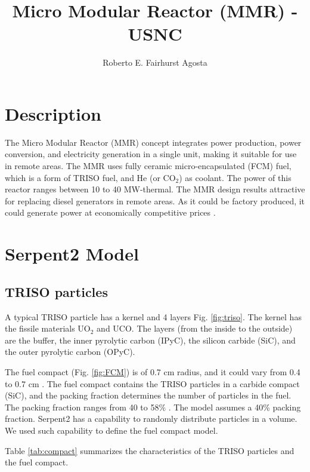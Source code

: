 \documentclass[11pt,letterpaper]{article}
\title{Micro Modular Reactor (MMR) - USNC}
\author{Roberto E. Fairhurst Agosta}
\begin{document}

\section{Description}

The Micro Modular Reactor (MMR) concept integrates power production, power conversion, and electricity generation in a single unit, making it suitable for use in remote areas. 
The MMR uses fully ceramic micro-encapsulated (FCM) fuel, which is a form of TRISO fuel, and He (or CO$_2$) as coolant.
The power of this reactor ranges between 10 to 40 MW-thermal.
The MMR design results attractive for replacing diesel generators in remote areas.
As it could be factory produced, it could generate power at economically competitive prices \cite{hawari_development_2018}.

\section{Serpent2 Model}

\subsection{TRISO particles}

A typical TRISO particle has a kernel and 4 layers Fig. \ref{fig:triso}.
The kernel has the fissile materials UO$_2$ and UCO.
The layers (from the inside to the outside) are the buffer, the inner pyrolytic carbon (IPyC), the silicon carbide (SiC), and the outer pyrolytic carbon (OPyC).

The fuel compact (Fig. \ref{fig:FCM}) is of 0.7 cm radius, and it could vary from 0.4 to 0.7 cm \cite{powers_fully_2013}.
The fuel compact contains the TRISO particles in a carbide compact (SiC), and the packing fraction determines the number of particles in the fuel. The packing fraction ranges from 40 to 58\% \cite{powers_fully_2013}.
The model assumes a 40\% packing fraction.
Serpent2 has a capability to randomly distribute particles in a volume.
We used such capability to define the fuel compact model.

Table \ref{tab:compact} summarizes the characteristics of the TRISO particles and the fuel compact.
\end{document}
